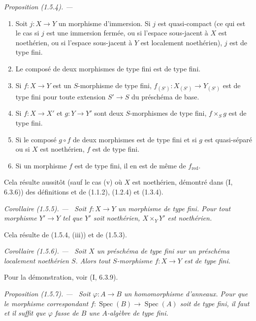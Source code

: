 \documentclass[10pt,oneside]{book}
\makeatletter
\newcommand{\setmanualcurrentlabel}[1]{\def\@currentlabel{#1}}
\newenvironment{proposition}[1][]{%
  \setmanualcurrentlabel{#1}\par\medskip\noindent\itshape Proposition (#1). ---\ }{\par}
\newenvironment{corollary}[1][]{%
  \setmanualcurrentlabel{#1}\par\medskip\noindent\itshape Corollaire (#1). ---\ }{\par}
\makeatother
\begin{document}
\begin{proposition}[1.5.4]
\label{IV.1.5.4-fr}
\begin{enumerate}
  \item[(i)] Soit $j:X\to Y$ un morphisme d'immersion. Si $j$ est
  quasi-compact (ce qui est le cas si $j$ est une immersion fermée, ou si
  l'espace sous-jacent à $X$ est noethérien, ou si l'espace sous-jacent à $Y$
  est localement noethérien), $j$ est de type fini.
  \item[(ii)] Le composé de deux morphismes de type fini est de type fini.
  \item[(iii)] Si $f:X\to Y$ est un $S$-morphisme de type fini,
  $f_{(S')}:X_{(S')}\to Y_{(S')}$ est de type fini pour toute extension
  $S'\to S$ du préschéma de base.
  \item[(iv)] Si $f:X\to X'$ et $g:Y\to Y'$ sont deux $S$-morphismes de type
  fini, $f\times_Sg$ est de type fini.
  \item[(v)] Si le composé $g\circ f$ de deux morphismes est de type fini et
  si $g$ est quasi-séparé ou si $X$ est noethérien, $f$ est de type fini.
  \item[(vi)] Si un morphisme $f$ est de type fini, il en est de même de
  $f_{\mathrm{red}}$.
\end{enumerate}
\end{proposition}

Cela résulte aussitôt (sauf le cas (v) où $X$ est noethérien, démontré dans
(I, 6.3.6)) des définitions et de (1.1.2), (1.2.4) et (1.3.4).

\begin{corollary}[1.5.5]
\label{IV.1.5.5-fr}
Soit $f:X\to Y$ un morphisme de type fini. Pour tout morphisme $Y'\to Y$ tel
que $Y'$ soit noethérien, $X\times_YY'$ est noethérien.
\end{corollary}

Cela résulte de (1.5.4, (iii)) et de (1.5.3).

\begin{corollary}[1.5.6]
\label{IV.1.5.6-fr}
Soit $X$ un préschéma de type fini sur un préschéma localement noethérien $S$.
Alors tout $S$-morphisme $f:X\to Y$ est de type fini.
\end{corollary}

Pour la démonstration, voir (I, 6.3.9).

\begin{proposition}[1.5.7]
\label{IV.1.5.7-fr}
Soit $\varphi:A\to B$ un homomorphisme d'anneaux. Pour que le morphisme
correspondant $f:\operatorname{Spec}(B)\to\operatorname{Spec}(A)$ soit de type fini, il faut et il suffit
que $\varphi$ fasse de $B$ une $A$-algèbre de type fini.
\end{proposition}
\end{document}
